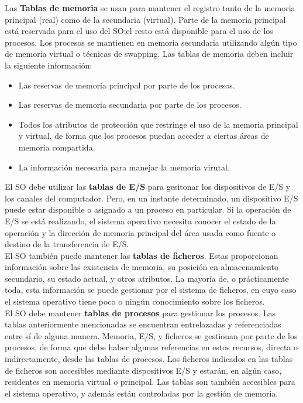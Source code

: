 \documentclass{article}
\begin{document}
				Las \textbf{Tablas de memoria} se usan para mantener el registro tanto de la memoria principal (real) como de la secundaria (virtual). Parte de la memoria principal está reservada para el uso del SO;el resto está disponible para el uso de los procesos. Los procesos se mantienen en memoria secundaria utilizando algún tipo de memoria virtual o técnicas de swapping. Las tablas de memoria deben incluir la siguiente información:
				
				\begin{itemize}
				\item Las reservas de memoria principal por parte de los procesos.
				\item Las reservas de memoria secundaria por parte de los procesos.
				\item Todos los atributos de protección que restringe el uso de la memoria principal y virtual, de forma que los procesos puedan acceder a ciertas áreas de memoria compartida.
				\item La información necesaria para manejar la memoria virutal.
				\end{itemize}
				
				El SO debe utilizar las \textbf{tablas de E/S} para gesitonar los dispositivos de E/S y los canales del computador. Pero, en un instante determinado, un dispositivo E/S puede estar disponible o asignado a un proceso en particular. Si la operación de E/S se está realizando, el sistema operativo necesita conocer el estado de la operación y la dirección de memoria principal del área usada como fuente o destino de la transferencia de E/S. \\
				
				El SO también puede mantener las \textbf{tablas de ficheros}. Estas proporcionan información sobre las existencia de memoria, su posición en almacenamiento secundario, su estado actual, y otros atributos. La mayoría de, o prácticamente toda, esta información se puede gestionar por el sistema de ficheros, en cuyo caso el sistema operativo tiene poco o ningún conocimiento sobre los ficheros. \\
				
				El SO debe mantener \textbf{tablas de procesos} para gestionar los procesos. Las tablas anteriormente mencionadas se encuentran entrelazadas y referenciadas entre sí de alguna manera. Memoria, E/S, y ficheros se gestionan por parte de los procesos, de forma que debe haber algunas referencias en estos recursos, directa o indirectamente, desde las tablas de procesos. Los ficheros indicados en las tablas de ficheros son accesibles mediante dispositivos E/S y estarán, en algún caso, residentes en memoria virtual o principal. Las tablas son también accesibles para el sistema operativo, y además están controladas por la gestión de memoria.
				
\end{document}
